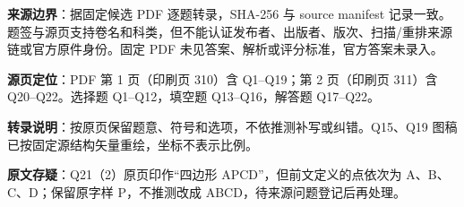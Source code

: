 

\begin{gktip}
\textbf{来源边界}：据固定候选 PDF 逐题转录，SHA-256 与 source manifest 记录一致。题签与源页支持卷名和科类，但不能认证发布者、出版者、版次、扫描/重排来源链或官方原件身份。固定 PDF 未见答案、解析或评分标准，官方答案未录入。

\textbf{源页定位}：PDF 第 1 页（印刷页 310）含 Q1–Q19；第 2 页（印刷页 311）含 Q20–Q22。选择题 Q1–Q12，填空题 Q13–Q16，解答题 Q17–Q22。

\textbf{转录说明}：按原页保留题意、符号和选项，不依推测补写或纠错。Q15、Q19 图稿已按固定源结构矢量重绘，坐标不表示比例。

\textbf{原文存疑}：Q21（2）原页印作“四边形 APCD”，但前文定义的点依次为 A、B、C、D；保留原字样 P，不推测改成 ABCD，待来源问题登记后再处理。
\end{gktip}


